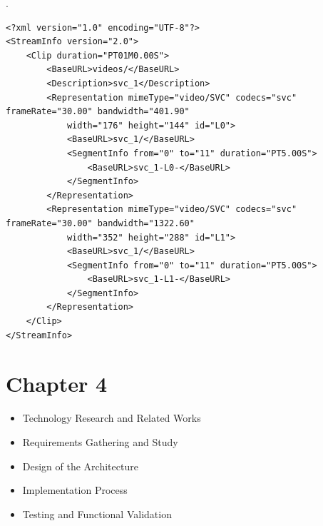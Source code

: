 .

\begin{minipage}[c]{0.95\textwidth}
\begin{center}
\begin{spacing}{0.5}
\begin{lstlisting}[frame=lines,style=XML,caption={Example of a MPD file.},label=mpd]
<?xml version="1.0" encoding="UTF-8"?>
<StreamInfo version="2.0">
    <Clip duration="PT01M0.00S">
        <BaseURL>videos/</BaseURL>
        <Description>svc_1</Description>
        <Representation mimeType="video/SVC" codecs="svc" frameRate="30.00" bandwidth="401.90"
            width="176" height="144" id="L0">
            <BaseURL>svc_1/</BaseURL>
            <SegmentInfo from="0" to="11" duration="PT5.00S">
                <BaseURL>svc_1-L0-</BaseURL>
            </SegmentInfo>
        </Representation>
        <Representation mimeType="video/SVC" codecs="svc" frameRate="30.00" bandwidth="1322.60"
            width="352" height="288" id="L1">
            <BaseURL>svc_1/</BaseURL>
            <SegmentInfo from="0" to="11" duration="PT5.00S">
                <BaseURL>svc_1-L1-</BaseURL>
            </SegmentInfo>
        </Representation>
    </Clip>
</StreamInfo>
\end{lstlisting}
\end{spacing}
\end{center}
\end{minipage}


\section{Chapter 4}

\begin{itemize}
\item{Technology Research and Related Works}
\item{Requirements Gathering and Study}
\item{Design of the Architecture}
\item{Implementation Process}
\item{Testing and Functional Validation}
\end{itemize}


